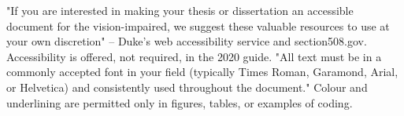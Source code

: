 %
%


%


%
	{"If you are interested in making your thesis or dissertation an accessible
	 document for the vision-impaired, we suggest these valuable resources to
	 use at your own discretion" -- Duke's web accessibility service and
	 section508.gov. Accessibility is offered, not required, in the 2020 guide.}
	{"All text must be in a commonly accepted font in your field (typically
	 Times Roman, Garamond, Arial, or Helvetica) and consistently used
	 throughout the document." Colour and underlining are permitted only in
	 figures, tables, or examples of coding.}

